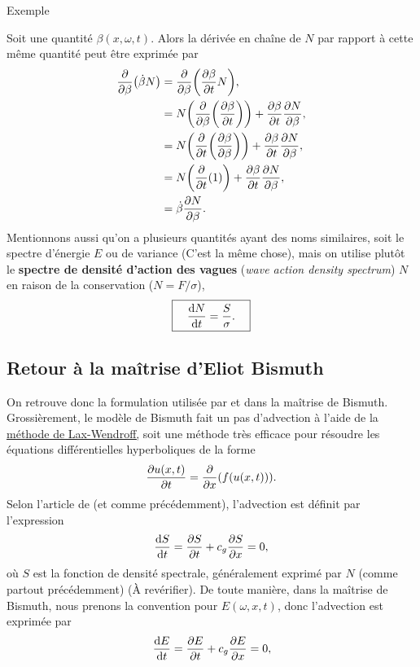 \documentclass[10pt]{article}
\numberwithin{equation}{section}
\newcommand{\grande}{\vphantom{\frac{1}{xx}}}
\newcommand{\exemple}{
\parbox[center]{2.2cm}{\begin{tcolorbox}[sharp corners, rounded corners=northeast, rounded corners=southeast,
colback=Violet!2, colframe=black,
size=small, width=2cm, left=-0.25pt, bottom=-0.5pt,
arc is angular, arc=2.5mm, boxrule=0.35pt, leftrule=4pt, %
after={\enskip}] Exemple \end{tcolorbox}}}
\begin{document}
\exemple Soit une quantité \(\beta(x,\omega,t)\).
Alors la dérivée en chaîne de \(N\) par rapport à cette même quantité peut être exprimée par
\begin{align}
   \pdv{}{\beta}\qty(\dot{\beta} N) &= \pdv{}{\beta} \qty(\pdv{\beta}{t} N),\nonumber\\
   &= N \qty(\pdv{}{\beta} \qty(\pdv{\beta}{t})) + \pdv{\beta}{t}\pdv{N}{\beta},\nonumber\\
   &= N \qty(\pdv{}{t} \qty(\pdv{\beta}{\beta})) + \pdv{\beta}{t}\pdv{N}{\beta},\nonumber\\
   &= N \qty(\pdv{}{t} \qty(1)) + \pdv{\beta}{t}\pdv{N}{\beta},\nonumber\\
   &= \dot{\beta}\pdv{N}{\beta}.
\end{align}
Mentionnons aussi qu'on a plusieurs quantités ayant des noms similaires, soit le spectre d'énergie \(E\) ou de variance (C'est la même chose), mais on utilise plutôt le \textbf{spectre de densité d'action des vagues} (\emph{wave action density spectrum}) \(N\) en raison de la conservation (\(N = F/\sigma\)),
\begin{equation}
  \boxed{\quad \grande\dv{N}{t} = \frac{S}{\sigma}.\quad }
\end{equation}
\subsection{Retour à la maîtrise d'Eliot Bismuth}
\label{sec:orgb921299}

On retrouve donc la formulation utilisée par \Textcite{william2013wave} et dans la maîtrise de Bismuth.
Grossièrement, le modèle de Bismuth fait un pas d'advection à l'aide de la \href{https://en.wikipedia.org/wiki/Lax\%E2\%80\%93Wendroff\_method}{méthode de Lax-Wendroff,} soit une méthode très efficace pour résoudre les équations différentielles hyperboliques de la forme
\begin{equation}
\label{eq:orgfa16c26}
   \pdv{u(x,t)}{t} = \pdv{}{x}\qty(f(u(x,t))).
\end{equation}
Selon l'article de \Textcite{william2013wave} (et comme précédemment), l'advection est définit par l'expression
\begin{equation}
   \dv{S}{t} = \pdv{S}{t} + c_g \pdv{S}{x} = 0,
\end{equation}
où \(S\) est la fonction de densité spectrale, généralement exprimé par \(N\) (comme partout précédemment) (À revérifier).
De toute manière, dans la maîtrise de Bismuth, nous prenons la convention pour \(E(\omega,x,t)\), donc l'advection est exprimée par
\begin{equation}
\label{eq:org4215ad5}
   \dv{E}{t} = \pdv{E}{t} + c_g \pdv{E}{x} = 0,
\end{equation}
\end{document}
